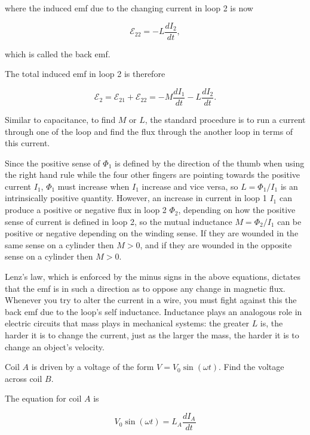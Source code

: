 \documentclass[english,a4paper,12pt]{report}
\begin{document}
where the induced emf due to the changing current in loop 2 is now

\begin{equation}
    \mathcal{E}_{22} = - L\frac{dI_2 }{dt},  
\end{equation}

which is called the back emf.

The total induced emf in loop 2 is therefore

\begin{equation}
    \mathcal{E}_{2}   = \mathcal{E} _{21} + \mathcal{E}_{22} =  -M\frac{dI_1 }{dt}  - L \frac{dI_2 }{dt}.
\end{equation}

Similar to capacitance, to find \(M \text { or } L\), the standard procedure is to run a current through one of the loop and find the flux through the another loop in terms of this current. 

Since the positive sense of \(\Phi _{1} \) is defined by the direction of the thumb when using the right hand rule while the four other fingers are pointing towards the positive current \(I_1 \), \(\Phi_{1}  \) must increase when \(I_1 \) increase and vice versa, so \(L = \Phi _{1} /I_1  \) is an intrinsically positive quantity. However, an increase in current in loop 1 \(I_1 \) can produce a positive or negative flux in loop 2 \(\Phi _{2} \), depending on how the positive sense of current is defined in loop 2, so the mutual inductance \(M = \Phi _{2} /I_1  \) can be positive or negative depending on the winding sense. If they are wounded in the same sense on a cylinder then \(M > 0\), and if they are wounded in the opposite sense on a cylinder then \(M > 0\).  

Lenz's law, which is enforced by the minus signs in the above equations, dictates that the emf is in such a direction as to oppose any change in magnetic flux. Whenever you try to alter the current in a wire, you must fight against this the back emf due to the loop's self inductance. Inductance plays an analogous role in electric circuits that mass plays in mechanical systems: the greater \(L\) is, the harder it is to change the current, just as the larger the mass, the harder it is to change an object's velocity.

{Coil \(A\) is driven by a voltage of the form \(V = V_0 \sin (\omega t)\). Find the voltage across coil \(B\).  }
{The equation for coil \(A\) is 

\begin{equation}
    V_0 \sin (\omega t) = L_{A} \frac{dI_{A} }{dt}  
\end{equation}

} 
\end{document}
